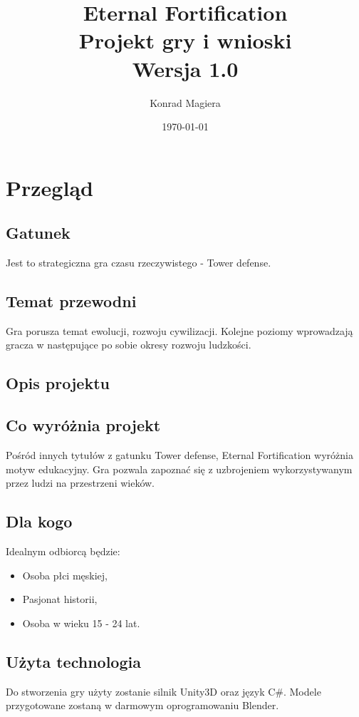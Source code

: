 \documentclass[a4paper,12pt, twoside, titlepage]{article}
\title{\Huge{\textbf{Eternal Fortification}}\\ \Large{Projekt gry i wnioski}\\ \large{Wersja 1.0}}
\author{Konrad Magiera}
\date{\today}
\begin{document}
\maketitle
\newpage
{}
\tableofcontents
\newpage


\section{Przegląd}
\subsection{Gatunek}
Jest to strategiczna gra czasu rzeczywistego - Tower defense.

\subsection{Temat przewodni}
Gra porusza temat ewolucji, rozwoju cywilizacji. Kolejne poziomy wprowadzają gracza w następujące po sobie okresy rozwoju ludzkości.

\subsection{Opis projektu}


\subsection{Co wyróżnia projekt}
Pośród innych tytułów z gatunku Tower defense, Eternal Fortification wyróżnia motyw edukacyjny. Gra pozwala zapoznać się z uzbrojeniem wykorzystywanym przez ludzi na przestrzeni wieków.

\subsection{Dla kogo}
Idealnym odbiorcą będzie:
\begin{itemize}
	\item Osoba płci męskiej,
	\item Pasjonat historii,
	\item Osoba w wieku 15 - 24 lat.
\end{itemize}

\subsection{Użyta technologia}
Do stworzenia gry użyty zostanie silnik Unity3D oraz język C\#. Modele przygotowane zostaną w darmowym oprogramowaniu Blender.
\end{document}
